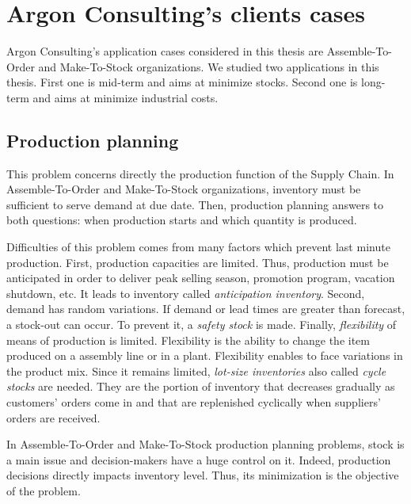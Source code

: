 \section{Argon Consulting's clients cases}


Argon Consulting's application cases considered in this thesis are Assemble-To-Order and Make-To-Stock organizations.
We studied two applications in this thesis.
First one is mid-term and aims at minimize stocks.
Second one is long-term and aims at minimize industrial costs.


\subsection{Production planning}
\label{sec:business-context:argon:pdp}


This problem concerns directly the production function of the Supply Chain.
In Assemble-To-Order and Make-To-Stock organizations, inventory must be sufficient to serve demand at due date.
Then, production planning answers to both questions: when production starts and which quantity is produced.


Difficulties of this problem comes from many factors which prevent last minute production.
First, production capacities are limited.
Thus, production must be anticipated in order to deliver peak selling season, promotion program, vacation shutdown, etc.
It leads to inventory called \emph{anticipation inventory}.
Second, demand has random variations.
If demand or lead times are greater than forecast, a stock-out can occur.
To prevent it, a \emph{safety stock} is made.
Finally, \emph{flexibility} of means of production is limited.
Flexibility is the ability to change the item produced on a assembly line or in a plant.
Flexibility enables to face variations in the product mix.
Since it remains limited, \emph{lot-size inventories} also called \emph{cycle stocks} are needed.
They are the portion of inventory that decreases gradually as customers’ orders come in and that are replenished cyclically when suppliers’ orders are received.


In Assemble-To-Order and Make-To-Stock production planning problems, stock is a main issue and decision-makers have a huge control on it.
Indeed, production decisions directly impacts inventory level.
Thus, its minimization is the objective of the problem.


